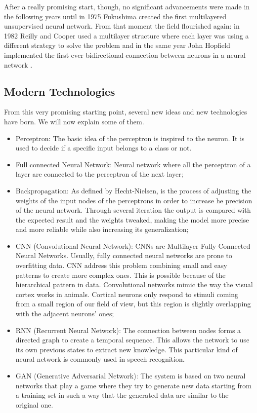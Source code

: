 \documentclass[conference]{IEEEtran}
\begin{document}
	After a really promising start, though, no significant advancements were made in the following years until in 1975 Fukushima created the first multilayered unsupervised neural network.\cite{f4} From that moment the field flourished again: in 1982 Reilly and Cooper used a multilayer structure where each layer was using a different strategy to solve the problem \cite{f5} and in the same year John Hopfield implemented the first ever bidirectional connection between neurons in a neural network \cite{f6}.

	\subsection{Modern Technologies}\label{MT}
	From this very promising starting point, several new ideas and new technologies have born. We will now explain some of them.

	\begin{itemize}

		\item Perceptron: The basic idea of the perceptron is inspired to the neuron. It is used to decide if a specific input belongs to a class or not. \cite{f7}

		\item Full connected Neural Network: Neural network where all the perceptron of a layer are connected to the perceptron of the next layer;

		\item Backpropagation: As defined by Hecht-Nielsen\cite{f8}, is the process of adjusting the weights of the input nodes of the perceptrons in order to increase he precision of the neural network. Through several iteration the output is compared with the expected result and the weights tweaked, making the model more precise and more reliable while also increasing its generalization;

		\item CNN (Convolutional Neural Network): CNNs are Multilayer Fully Connected Neural Networks. Usually, fully connected neural networks are prone to overfitting data. CNN address this problem combining small and easy patterns to create more complex ones. This is possible because of the hierarchical pattern in data.
		Convolutional networks mimic the way the visual cortex works in animals. Cortical neurons only respond to stimuli coming from a small region of our field of view, but this region is slightly overlapping with the adjacent neurons' ones; \cite{f9}

		\item RNN (Recurrent Neural Network): The connection between nodes forms a directed graph to create a temporal sequence. This allows the network to use its own previous states to extract new knowledge. This particular kind of neural network is commonly used in speech recognition. \cite{f10}

		\item GAN (Generative Adversarial Network): The system is based on two neural networks that play a game where they try to generate new data starting from a training set in such a way that the generated data are similar to the original one. \cite{f11}

	\end{itemize}
\end{document}
